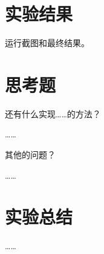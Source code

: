 \documentclass[fontsize=10.5pt]{ctexart}
\begin{document}
\section{实验结果}

运行截图和最终结果。

\section{思考题}

\begin{formal}{}
    还有什么实现……的方法？
\end{formal}

……

\begin{formal}{}
    其他的问题？
\end{formal}

……

\section{实验总结}

……
\end{document}
